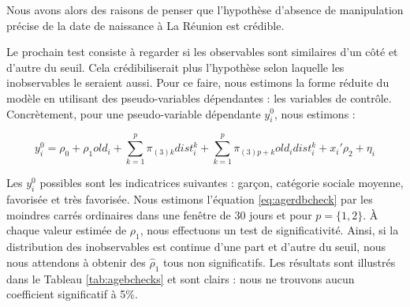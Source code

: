 \documentclass[
]{book}
\begin{document}
\quad Nous avons alors des raisons de penser que l'hypothèse d'absence de manipulation précise de la date de naissance à La Réunion est crédible.

\quad Le prochain test consiste à regarder si les observables sont similaires d'un côté et d'autre du seuil. Cela crédibiliserait plus l'hypothèse selon laquelle les inobservables le seraient aussi. Pour ce faire, nous estimons la forme réduite du modèle en utilisant des pseudo-variables dépendantes : les variables de contrôle. Concrètement, pour une pseudo-variable dépendante \(y^0_i\), nous estimons :

\begin{equation}
\label{eq:agerdbcheck}
y^0_i = \rho_0 + \rho_1 old_i + \sum_{k = 1}^p \pi_{(3)k} dist_i^k + \sum_{k = 1}^p \pi_{(3)p+k} old_i dist_i^k + x_i ' \rho_2 + \eta_i
\end{equation}

Les \(y^0_i\) possibles sont les indicatrices suivantes : garçon, catégorie sociale moyenne, favorisée et très favorisée. Nous estimons l'équation \eqref{eq:agerdbcheck} par les moindres carrés ordinaires dans une fenêtre de 30 jours et pour \(p = \{1, 2\}\). À chaque valeur estimée de \(\rho_1\), nous effectuons un test de significativité. Ainsi, si la distribution des inobservables est continue d'une part et d'autre du seuil, nous nous attendons à obtenir des \(\hat{\rho}_1\) tous non significatifs. Les résultats sont illustrés dans le Tableau \ref{tab:agebchecks} et sont clairs : nous ne trouvons aucun coefficient significatif à 5\%.

\begingroup\fontsize{8}{10}\selectfont
\end{document}
